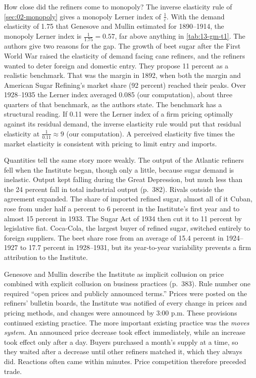 How close did the refiners come to monopoly? The inverse elasticity rule of \cref{sec:02-monopoly} gives a
monopoly Lerner index of $\frac{1}{\varepsilon}$. With the demand elasticity of 1.75 that Genesove and Mullin
estimated for 1890--1914, the monopoly Lerner index is $\frac{1}{1.75} = 0.57$, far above anything in
\cref{tab:13-gm-t1}. The authors give two reasons for the gap. The growth of beet sugar after the First World War
raised the elasticity of demand facing cane refiners, and the refiners wanted to deter foreign and domestic
entry. They propose 11 percent as a realistic benchmark. That was the margin in 1892, when both the margin and
American Sugar Refining's market share (92 percent) reached their peaks. Over 1928--1935 the Lerner index
averaged 0.085 (our computation), about three quarters of that benchmark, as the authors state. The benchmark has
a structural reading. If 0.11 were the Lerner index of a firm pricing optimally against its residual demand, the
inverse elasticity rule would put that residual elasticity at $\frac{1}{0.11} \approx 9$ (our computation). A
perceived elasticity five times the market elasticity is consistent with pricing to limit entry and imports.

Quantities tell the same story more weakly. The output of the Atlantic refiners fell when the Institute began,
though only a little, because sugar demand is inelastic. Output kept falling during the Great Depression, but much
less than the 24 percent fall in total industrial output (p.~382). Rivals outside the agreement expanded. The
share of imported refined sugar, almost all of it Cuban, rose from under half a percent to 6 percent in the
Institute's first year and to almost 15 percent in 1933. The Sugar Act of 1934 then cut it to 11 percent by
legislative fiat. Coca-Cola, the largest buyer of refined sugar, switched entirely to foreign suppliers. The beet
share rose from an average of 15.4 percent in 1924--1927 to 17.7 percent in 1928--1931, but its year-to-year
variability prevents a firm attribution to the Institute.

Genesove and Mullin describe the Institute as implicit collusion on price combined with explicit collusion on
business practices (p.~383). Rule number one required ``open prices and publicly announced terms.'' Prices
were posted on the refiners' bulletin boards, the Institute was notified of every change in prices and pricing
methods, and changes were announced by 3:00 p.m. These provisions continued existing practice. The more
important existing practice was the \emph{moves system}. An announced price decrease took effect immediately,
while an increase took effect only after a day. Buyers purchased a month's supply at a time, so they waited after
a decrease until other refiners matched it, which they always did. Reactions often came within minutes. Price
competition therefore preceded trade.

